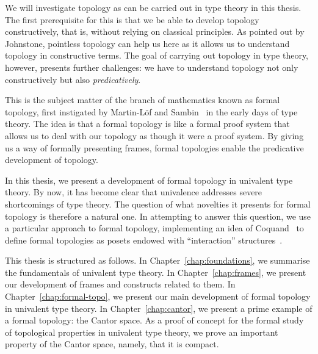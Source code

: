 We will investigate topology as can be carried out in type theory in this thesis. The
first prerequisite for this is that we be able to develop topology constructively, that
is, without relying on classical principles. As pointed out by Johnstone, pointless
topology can help us here as it allows us to understand topology in constructive terms.
The goal of carrying out topology in type theory, however, presents further challenges: we
have to understand topology not only constructively but also \emph{predicatively}.

This is the subject matter of the branch of mathematics known as formal topology, first
instigated by Martin-Löf and Sambin~\cite{int-formal-spaces} in the early days of type
theory. The idea is that a formal topology is like a formal proof system that allows us to
deal with our topology as though it were a proof system. By giving us a way of formally
presenting frames, formal topologies enable the predicative development of topology.

In this thesis, we present a development of formal topology in univalent type theory. By
now, it has become clear that univalence addresses severe shortcomings of type theory. The
question of what novelties it presents for formal topology is therefore a natural one. In
attempting to answer this question, we use a particular approach to formal topology,
implementing an idea of Coquand~\cite{coq-posets} to define formal topologies as posets
endowed with ``interaction'' structures~\cite{tree-sets, hancock-interaction-systems}.

This thesis is structured as follows. In Chapter~\ref{chap:foundations}, we summarise the
fundamentals of univalent type theory. In Chapter~\ref{chap:frames}, we present our
development of frames and constructs related to them. In Chapter~\ref{chap:formal-topo},
we present our main development of formal topology in univalent type theory. In
Chapter~\ref{chap:cantor}, we present a prime example of a formal topology: the Cantor
space. As a proof of concept for the formal study of topological properties in univalent
type theory, we prove an important property of the Cantor space, namely, that it is
compact.
